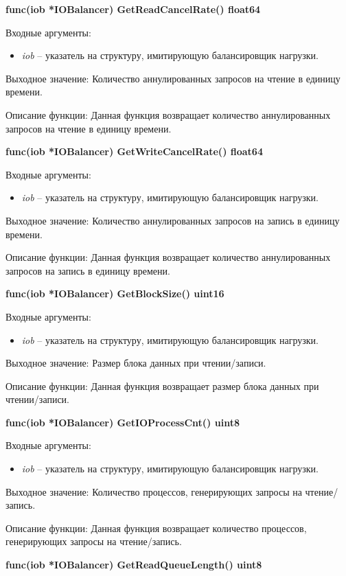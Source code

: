 \textbf{func(iob *IOBalancer) GetReadCancelRate() float64}

Входные аргументы:
\begin{itemize}
	\item \textit{iob} -- указатель на структуру, имитирующую балансировщик нагрузки. 
\end{itemize}

Выходное значение: Количество аннулированных запросов на чтение в единицу времени.

Описание функции: Данная функция возвращает количество аннулированных запросов на чтение в единицу времени.

\textbf{func(iob *IOBalancer) GetWriteCancelRate() float64}

Входные аргументы:
\begin{itemize}
	\item \textit{iob} -- указатель на структуру, имитирующую балансировщик нагрузки. 
\end{itemize}

Выходное значение: Количество аннулированных запросов на запись в единицу времени. 

Описание функции: Данная функция возвращает количество аннулированных запросов на запись в единицу времени.

\textbf{func(iob *IOBalancer) GetBlockSize() uint16}

Входные аргументы:
\begin{itemize}
	\item \textit{iob} -- указатель на структуру, имитирующую балансировщик нагрузки. 
\end{itemize}
Выходное значение:  Размер блока данных при чтении/записи.

Описание функции: Данная функция возвращает  размер блока данных при чтении/записи.

\textbf{func(iob *IOBalancer) GetIOProcessCnt() uint8}

Входные аргументы:
\begin{itemize}
	\item \textit{iob} -- указатель на структуру, имитирующую балансировщик нагрузки. 
\end{itemize}

Выходное значение: Количество процессов, генерирующих запросы на чтение/запись.

Описание функции: Данная функция возвращает количество процессов, генерирующих запросы на чтение/запись.

\textbf{func(iob *IOBalancer) GetReadQueueLength() uint8}

